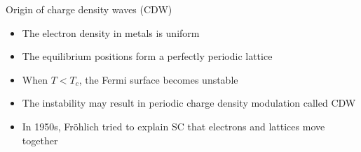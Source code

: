 \documentclass{beamer}
\newcommand*\vf[1]{\mathbf{#1}}
\begin{document}

\begin{frame}{Origin of charge density waves (CDW)}
\begin{itemize}
\item The electron density in metals is uniform
\item The equilibrium positions form a perfectly periodic lattice
\item When $T < T_c$, the Fermi surface becomes unstable
\item The instability may result in periodic charge density modulation called CDW
\item In 1950s, Fr\"{o}hlich tried to explain SC that electrons and lattices move together
\end{itemize}
\end{frame}
\end{document}
